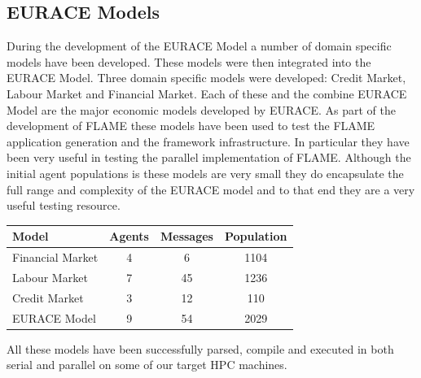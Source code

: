 \subsection{EURACE Models}
During the development of the EURACE Model a number of domain specific models have been developed. These models were then integrated into the EURACE Model. Three domain specific models were developed: Credit Market, Labour Market and Financial Market. Each of these and the combine EURACE Model are the major economic models developed by EURACE. As part of the development of FLAME these models have been used to test the FLAME application generation and the framework infrastructure. In particular they have been very useful in testing the parallel implementation of FLAME. Although the initial agent populations is these models are very small they do encapsulate the full range and complexity of the EURACE model and to that end they are a very useful testing resource.

\begin{table}[ht]
 \centering
  \begin{tabular}{l|ccc}
  Model & Agents & Messages & Population \\\hline
  Financial Market  &    4    &   6       &  1104          \\
  Labour Market   &   7     &    45      &   1236         \\
  Credit Market   &   3     &    12      &   110         \\ 
  EURACE Model    &   9     &    54       &  2029         \\\hline
  \end{tabular}
\end{table}

All these models have been successfully parsed, compile and executed in both serial and parallel on some of our target HPC machines.